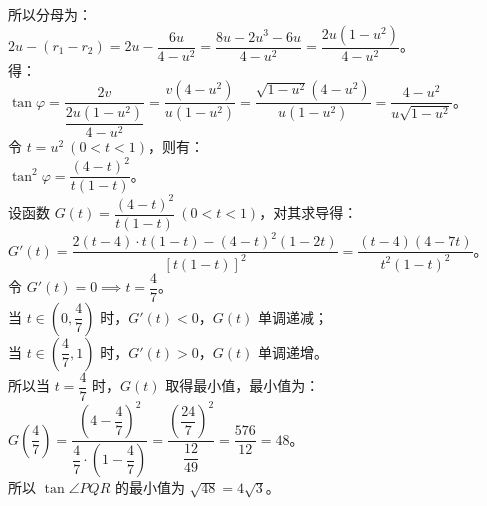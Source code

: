 {  所以分母为：\\
  \(2u - (r_1 - r_2) = 2u - \dfrac{6u}{4 - u^2} = \dfrac{8u - 2u^3 - 6u}{4 - u^2} = \dfrac{2u(1 - u^2)}{4 - u^2}\)。\\
  得：\\
  \(\tan\varphi = \dfrac{2v}{\dfrac{2u(1 - u^2)}{4 - u^2}} = \dfrac{v(4 - u^2)}{u(1 - u^2)} = \dfrac{\sqrt{1 - u^2}(4 - u^2)}{u(1 - u^2)} = \dfrac{4 - u^2}{u\sqrt{1 - u^2}}\)。\\
  令 \(t = u^2 \ (0 < t < 1)\)，则有：\\
  \(\tan^2\varphi = \dfrac{(4 - t)^2}{t(1 - t)}\)。\\
  设函数 \(G(t) = \dfrac{(4 - t)^2}{t(1 - t)} \ (0 < t < 1)\)，对其求导得：\\
  \(G'(t) = \dfrac{2(t-4) \cdot t(1-t) - (4-t)^2(1-2t)}{[t(1-t)]^2} = \dfrac{(t-4)(4 - 7t)}{t^2(1-t)^2}\)。\\
  令 \(G'(t) = 0 \implies t = \dfrac{4}{7}\)。\\
  当 \(t \in \left(0, \dfrac{4}{7}\right)\) 时，\(G'(t) < 0\)，\(G(t)\) 单调递减；\\
  当 \(t \in \left(\dfrac{4}{7}, 1\right)\) 时，\(G'(t) > 0\)，\(G(t)\) 单调递增。\\
  所以当 \(t = \dfrac{4}{7}\) 时，\(G(t)\) 取得最小值，最小值为：\\
  \(G\left(\dfrac{4}{7}\right) = \dfrac{\left(4 - \dfrac{4}{7}\right)^2}{\dfrac{4}{7} \cdot \left(1 - \dfrac{4}{7}\right)} = \dfrac{\left(\dfrac{24}{7}\right)^2}{\dfrac{12}{49}} = \dfrac{576}{12} = 48\)。\\
  所以 \(\tan\angle PQR\) 的最小值为 \(\sqrt{48} = 4\sqrt{3}\)。%
}

\newcommand{\qEllipsePqrTangentDiagnosis}{%
  学生在解决解析几何第二问时，如果直接联立直线与椭圆方程设坐标，硬求三角形面积和夹角，会产生极度庞大的代数计算量，容易因算错或算不下去而放弃。本题利用焦点弦极坐标参数化，配合行列式与向量外积技巧，可将计算量极大缩减。%
}

\newcommand{\qEllipsePqrTangentTeachingNotes}{%
  极坐标法（焦点坐标化）是解决椭圆/双曲线中过焦点弦相关面积及夹角最值问题的顶级神兵。在讲评此题时，应向学生展示这一解析技巧，重点训练如何将倾角 \(\theta\) 表示为 \((u, v)\)，以及利用行列式计算面积和向量外积公式求解夹角正切值。%
}
